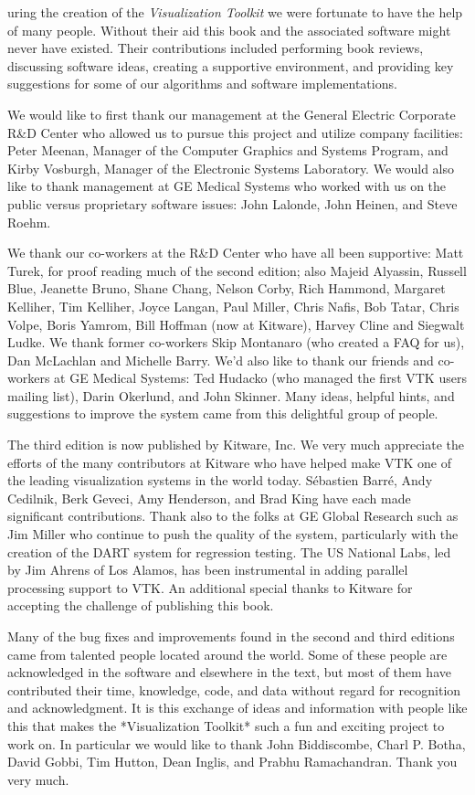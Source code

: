 uring the creation of the \textit{Visualization Toolkit} we were fortunate to have the help of many people. Without their aid this book and the associated software might never have existed. Their contributions included performing book reviews, discussing software ideas, creating a supportive environment, and providing key suggestions for some of our algorithms and software implementations.

We would like to first thank our management at the General Electric Corporate R\&D Center who allowed us to pursue this project and utilize company facilities: Peter Meenan, Manager of the Computer Graphics and Systems Program, and Kirby Vosburgh, Manager of the Electronic Systems Laboratory. We would also like to thank management at GE Medical Systems who worked with us on the public versus proprietary software issues: John Lalonde, John Heinen, and Steve Roehm.

We thank our co-workers at the R\&D Center who have all been supportive: Matt Turek, for proof reading much of the second edition; also Majeid Alyassin, Russell Blue, Jeanette Bruno, Shane Chang, Nelson Corby, Rich Hammond, Margaret Kelliher, Tim Kelliher, Joyce Langan, Paul Miller, Chris Nafis, Bob Tatar, Chris Volpe, Boris Yamrom, Bill Hoffman (now at Kitware), Harvey Cline and Siegwalt Ludke. We thank former co-workers Skip Montanaro (who created a FAQ for us), Dan McLachlan and Michelle Barry. We'd also like to thank our friends and co-workers at GE Medical Systems: Ted Hudacko (who managed the first VTK users mailing list), Darin Okerlund, and John Skinner. Many ideas, helpful hints, and suggestions to improve the system came from this delightful group of people.

The third edition is now published by Kitware, Inc. We very much appreciate the efforts of the many contributors at Kitware who have helped make VTK one of the leading visualization systems in the world today. Sébastien Barré, Andy Cedilnik, Berk Geveci, Amy Henderson, and Brad King have each made significant contributions. Thank also to the folks at GE Global Research such as Jim Miller who continue to push the quality of the system, particularly with the creation of the DART system for regression testing. The US National Labs, led by Jim Ahrens of Los Alamos, has been instrumental in adding parallel processing support to VTK. An additional special thanks to Kitware for accepting the challenge of publishing this book.

Many of the bug fixes and improvements found in the second and third editions came from talented people located around the world. Some of these people are acknowledged in the software and elsewhere in the text, but most of them have contributed their time, knowledge, code, and data without regard for recognition and acknowledgment. It is this exchange of ideas and information with people like this that makes the *Visualization Toolkit* such a fun and exciting project to work on. In particular we would like to thank John Biddiscombe, Charl P. Botha, David Gobbi, Tim Hutton, Dean Inglis, and Prabhu Ramachandran. Thank you very much.

